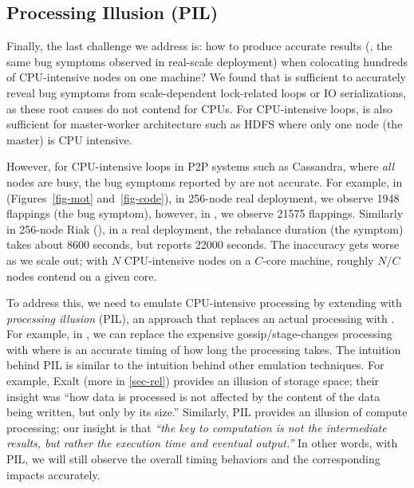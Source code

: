 

\subsection{Processing Illusion (PIL)}
\label{sc-pil}




Finally, the last challenge we address is: how to produce accurate results
(\ie, the same bug symptoms observed in real-scale deployment) when
colocating hundreds of CPU-intensive nodes on one machine?
%
We found that \stest is sufficient to accurately reveal bug symptoms from
scale-dependent lock-related loops or IO serializations, as these root
causes do not contend for CPUs.
%
For CPU-intensive loops, \stest is also sufficient for master-worker
architecture such as HDFS where only one node (the master) is CPU
intensive.


However, for CPU-intensive loops in P2P systems such as Cassandra, where
{\em all} nodes are busy, the bug symptoms reported by \stest are not
accurate.
%
For example, in \caone (Figures~\ref{fig-mot} and~\ref{fig-code}), in
256-node real deployment, we observe 1948 flappings (the bug symptom),
however, in \stest, we observe 21575 flappings.
%
Similarly in 256-node Riak (\riakone), in a real deployment, the
rebalance duration (the symptom) takes about 8600 seconds, but \stest
reports 22000 seconds.
%
The inaccuracy gets worse as we scale out; with $N$ CPU-intensive nodes on
a $C$-core machine, roughly $N/C$ nodes contend on a given core.



To address this, we need to emulate CPU-intensive processing by extending
\stest with {\em processing illusion} (PIL), an approach that replaces an
actual processing with \sleep.  For example, in \caone, we can replace the
expensive gossip/stage-changes processing with  where 
is an accurate timing of how long the processing takes.
%
The intuition behind PIL is similar to the intuition behind other
emulation techniques.
%
For example, Exalt \cite{Wang+14-Exalt} (more in \sec\ref{sec-rel})
provides an illusion of storage space; their insight was ``how data is
processed is not affected by the content of the data being written, but
only by its size.''
%
Similarly, PIL provides an illusion of compute processing; our insight is
that {\em ``the key to computation is not the intermediate results, but
  rather the execution time and eventual output.''}
%
In other words, with PIL, we will still observe the overall timing
behaviors and the corresponding impacts accurately.




